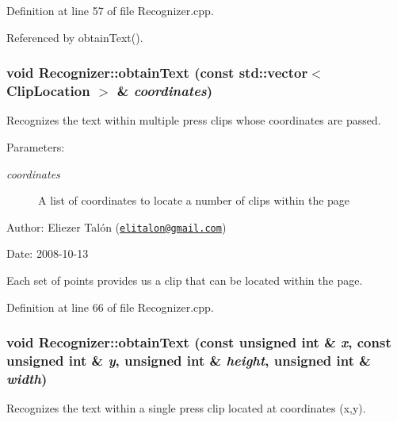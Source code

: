 Definition at line 57 of file Recognizer.cpp.

Referenced by obtainText().\hypertarget{class_recognizer_4b3b27b3746edcf831d142eddfb81f19}{
\subsubsection[obtainText]{\setlength{\rightskip}{0pt plus 5cm}void Recognizer::obtainText (const std::vector$<$ {\bf ClipLocation} $>$ \& {\em coordinates})}}
\label{class_recognizer_4b3b27b3746edcf831d142eddfb81f19}


Recognizes the text within multiple press clips whose coordinates are passed. 

\begin{Desc}
\item[Parameters:]
\begin{description}
\item[{\em coordinates}]A list of coordinates to locate a number of clips within the page\end{description}
\end{Desc}
\begin{Desc}
\item[Author:]Eliezer Talón (\href{mailto:elitalon@gmail.com}{\tt elitalon@gmail.com}) \end{Desc}
\begin{Desc}
\item[Date:]2008-10-13\end{Desc}
Each set of points provides us a clip that can be located within the page. 

Definition at line 66 of file Recognizer.cpp.\hypertarget{class_recognizer_d117f344b1f77711e6cbab0f15dbc269}{
\subsubsection[obtainText]{\setlength{\rightskip}{0pt plus 5cm}void Recognizer::obtainText (const unsigned int \& {\em x}, \/  const unsigned int \& {\em y}, \/  unsigned int \& {\em height}, \/  unsigned int \& {\em width})}}
\label{class_recognizer_d117f344b1f77711e6cbab0f15dbc269}


Recognizes the text within a single press clip located at coordinates (x,y). 

